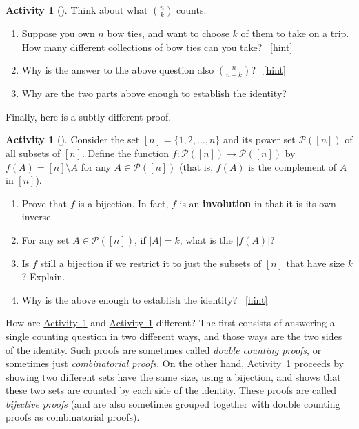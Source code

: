 \documentclass[10pt,]{book}
\newcommand{\terminology}[1]{\textbf{#1}}
\theoremstyle{plain}
\theoremstyle{definition}
\theoremstyle{definition}
\theoremstyle{definition}
\newtheorem{activity}[project]{Activity}
\numberwithin{equation}{chapter}
\def\pow{\mathcal P}
\newcommand{\card}[1]{\left| #1 \right|}
\begin{document}
\begin{activity}[]\label{act-pascalsym-dc}
\hypertarget{p-560}{}%
Think about what \(\binom{n}{k}\) counts.%
\begin{enumerate}[font=\bfseries,label=(\alph*),ref=\alph*]
\item\label{task-104} \hypertarget{p-561}{}%
Suppose you own \(n\) bow ties, and want to choose \(k\) of them to take on a trip.  How many different collections of bow ties can you take?%
~\hfill{\tiny\hyperlink{a-74.a}{[hint]}\hypertarget{q-74.a}{}}\item\label{task-105} \hypertarget{p-563}{}%
Why is the answer to the above question also \(\binom{n}{n-k}\)?%
~\hfill{\tiny\hyperlink{a-74.b}{[hint]}\hypertarget{q-74.b}{}}\item\label{task-106} \hypertarget{p-565}{}%
Why are the two parts above enough to establish the identity?%
\end{enumerate}
\end{activity}
\hypertarget{p-566}{}%
Finally, here is a subtly different proof.%
\begin{activity}[]\label{act-pascalsym-bij}
\hypertarget{p-567}{}%
Consider the set \([n] = \{1,2,\ldots,n\}\) and its power set \(\pow([n])\) of all subsets of \([n]\).  Define the function \(f:\pow([n]) \to \pow([n])\) by \(f(A) = [n]\setminus A\) for any \(A \in \pow([n])\) (that is, \(f(A)\) is the complement of \(A\) in \([n]\)).%
\begin{enumerate}[font=\bfseries,label=(\alph*),ref=\alph*]
\item\label{task-107} \hypertarget{p-568}{}%
Prove that \(f\) is a bijection.  In fact, \(f\) is an \terminology{involution} in that it is its own inverse.%
\item\label{task-108} \hypertarget{p-569}{}%
For any set \(A \in \pow([n])\), if \(\card{A} = k\), what is the \(\card{f(A)}\)?%
\item\label{task-109} \hypertarget{p-570}{}%
Is \(f\) still a bijection if we restrict it to just the subsets of \([n]\) that have size \(k\)?  Explain.%
\item\label{task-110} \hypertarget{p-571}{}%
Why is the above enough to establish the identity?%
~\hfill{\tiny\hyperlink{a-75.d}{[hint]}\hypertarget{q-75.d}{}}\end{enumerate}
\end{activity}
\hypertarget{p-573}{}%
How are \hyperref[act-pascalsym-dc]{Activity~\ref{act-pascalsym-dc}} and \hyperref[act-pascalsym-bij]{Activity~\ref{act-pascalsym-bij}} different?  The first consists of answering a single counting question in two different ways, and those ways are the two sides of the identity.  Such proofs are sometimes called \emph{double counting proofs}, or sometimes just \emph{combinatorial proofs}.  On the other hand, \hyperref[act-pascalsym-bij]{Activity~\ref{act-pascalsym-bij}} proceeds by showing two different sets have the same size, using a bijection, and shows that these two sets are counted by each side of the identity.  These proofs are called \emph{bijective proofs} (and are also sometimes grouped together with double counting proofs as combinatorial proofs).%
\end{document}
